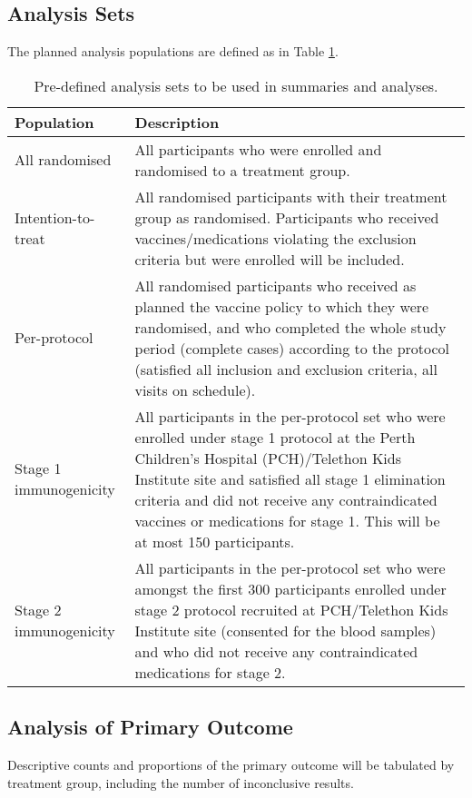 \documentclass{bmcart}
\begin{document}
\subsection*{Analysis Sets}

The planned analysis populations are defined as in Table \ref{tab:analysis-sets}.

\begin{table}[h!]
	\caption{Pre-defined analysis sets to be used in summaries and analyses.}
	\label{tab:analysis-sets}
	\begin{tabular}{lp{8cm}}
		Population & Description \\ \hline
		All randomised & All participants who were enrolled and randomised to a treatment group. \\
		Intention-to-treat & All randomised participants with their treatment group as randomised. Participants who received vaccines/medications violating the exclusion criteria but were enrolled will be included. \\
		Per-protocol & All randomised participants who received as planned the vaccine policy to which they were randomised, and who completed the whole study period (complete cases) according to the protocol (satisfied all inclusion and exclusion criteria, all visits on schedule).
		\\
		Stage 1 immunogenicity & All participants in the per-protocol set who were enrolled under stage 1 protocol at the Perth Children's Hospital (PCH)/Telethon Kids Institute site and satisfied all stage 1 elimination criteria and did not receive any contraindicated vaccines or medications for stage 1. This will be at most 150 participants. \\
		Stage 2 immunogenicity & All participants in the per-protocol set who were amongst the first 300 participants enrolled under stage 2 protocol recruited at PCH/Telethon Kids Institute site (consented for the blood samples) and who did not receive any contraindicated medications for stage 2. \\
		\hline
	\end{tabular}
\end{table}

\subsection*{Analysis of Primary Outcome}

Descriptive counts and proportions of the primary outcome will be tabulated by treatment group, including the number of inconclusive results.
\end{document}
